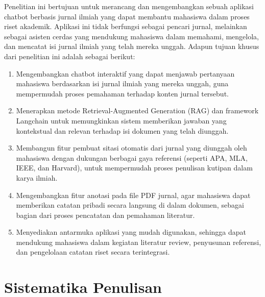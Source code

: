 Penelitian ini bertujuan untuk merancang dan mengembangkan sebuah aplikasi chatbot berbasis jurnal ilmiah yang dapat membantu mahasiswa dalam proses riset akademik. Aplikasi ini tidak berfungsi sebagai pencari jurnal, melainkan sebagai asisten cerdas yang mendukung mahasiswa dalam memahami, mengelola, dan mencatat isi jurnal ilmiah yang telah mereka unggah. Adapun tujuan khusus dari penelitian ini adalah sebagai berikut:
\begin{enumerate}
  \item Mengembangkan chatbot interaktif yang dapat menjawab pertanyaan mahasiswa berdasarkan isi jurnal ilmiah yang mereka unggah, guna mempermudah proses pemahaman terhadap konten jurnal tersebut.
  \item Menerapkan metode Retrieval-Augmented Generation (RAG) dan framework Langchain untuk memungkinkan sistem memberikan jawaban yang kontekstual dan relevan terhadap isi dokumen yang telah diunggah.
  \item Membangun fitur pembuat sitasi otomatis dari jurnal yang diunggah oleh mahasiswa dengan dukungan berbagai gaya referensi (seperti APA, MLA, IEEE, dan Harvard), untuk mempermudah proses penulisan kutipan dalam karya ilmiah.
  \item Mengembangkan fitur anotasi pada file PDF jurnal, agar mahasiswa dapat memberikan catatan pribadi secara langsung di dalam dokumen, sebagai bagian dari proses pencatatan dan pemahaman literatur.
  \item Menyediakan antarmuka aplikasi yang mudah digunakan, sehingga dapat mendukung mahasiswa dalam kegiatan literatur review, penyusunan referensi, dan pengelolaan catatan riset secara terintegrasi.
\end{enumerate}

\section{Sistematika Penulisan}


